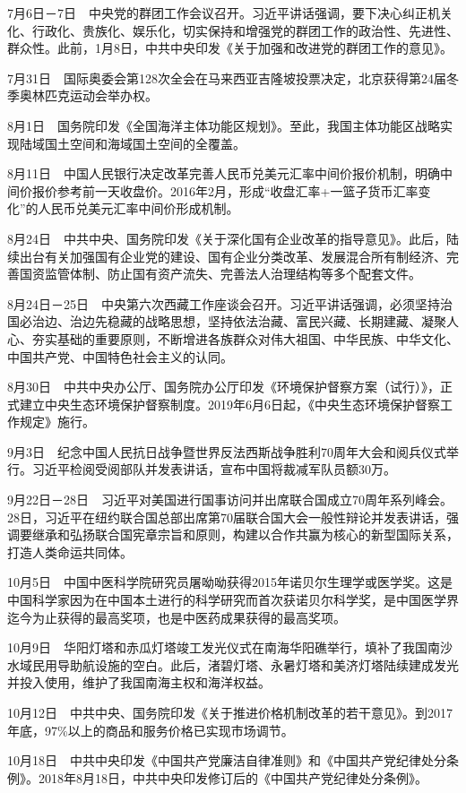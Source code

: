 \documentclass[10pt,a4paper,twocolumn]{book}
\begin{document}
7月6日－7日　中央党的群团工作会议召开。习近平讲话强调，要下决心纠正机关化、行政化、贵族化、娱乐化，切实保持和增强党的群团工作的政治性、先进性、群众性。此前，1月8日，中共中央印发《关于加强和改进党的群团工作的意见》。

7月31日　国际奥委会第128次全会在马来西亚吉隆坡投票决定，北京获得第24届冬季奥林匹克运动会举办权。

8月1日　国务院印发《全国海洋主体功能区规划》。至此，我国主体功能区战略实现陆域国土空间和海域国土空间的全覆盖。

8月11日　中国人民银行决定改革完善人民币兑美元汇率中间价报价机制，明确中间价报价参考前一天收盘价。2016年2月，形成“收盘汇率+一篮子货币汇率变化”的人民币兑美元汇率中间价形成机制。

8月24日　中共中央、国务院印发《关于深化国有企业改革的指导意见》。此后，陆续出台有关加强国有企业党的建设、国有企业分类改革、发展混合所有制经济、完善国资监管体制、防止国有资产流失、完善法人治理结构等多个配套文件。

8月24日－25日　中央第六次西藏工作座谈会召开。习近平讲话强调，必须坚持治国必治边、治边先稳藏的战略思想，坚持依法治藏、富民兴藏、长期建藏、凝聚人心、夯实基础的重要原则，不断增进各族群众对伟大祖国、中华民族、中华文化、中国共产党、中国特色社会主义的认同。

8月30日　中共中央办公厅、国务院办公厅印发《环境保护督察方案（试行）》，正式建立中央生态环境保护督察制度。2019年6月6日起，《中央生态环境保护督察工作规定》施行。

9月3日　纪念中国人民抗日战争暨世界反法西斯战争胜利70周年大会和阅兵仪式举行。习近平检阅受阅部队并发表讲话，宣布中国将裁减军队员额30万。

9月22日－28日　习近平对美国进行国事访问并出席联合国成立70周年系列峰会。28日，习近平在纽约联合国总部出席第70届联合国大会一般性辩论并发表讲话，强调要继承和弘扬联合国宪章宗旨和原则，构建以合作共赢为核心的新型国际关系，打造人类命运共同体。

10月5日　中国中医科学院研究员屠呦呦获得2015年诺贝尔生理学或医学奖。这是中国科学家因为在中国本土进行的科学研究而首次获诺贝尔科学奖，是中国医学界迄今为止获得的最高奖项，也是中医药成果获得的最高奖项。

10月9日　华阳灯塔和赤瓜灯塔竣工发光仪式在南海华阳礁举行，填补了我国南沙水域民用导助航设施的空白。此后，渚碧灯塔、永暑灯塔和美济灯塔陆续建成发光并投入使用，维护了我国南海主权和海洋权益。

10月12日　中共中央、国务院印发《关于推进价格机制改革的若干意见》。到2017年底，97\%以上的商品和服务价格已实现市场调节。

10月18日　中共中央印发《中国共产党廉洁自律准则》和《中国共产党纪律处分条例》。2018年8月18日，中共中央印发修订后的《中国共产党纪律处分条例》。
\end{document}
